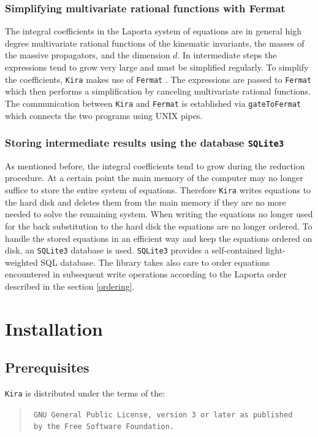 \documentclass[a4paper,12pt]{scrartcl}
\newcommand*{\kira}{\texttt{Kira}}
\newcommand*{\gatetofermat}{\texttt{gateToFermat}}
\newcommand*{\fermat}{\texttt{Fermat}}
\newcommand*{\sqlite}{\texttt{SQLite3}}
\begin{document}
\subsubsection{Simplifying multivariate rational functions with Fermat}
\label{Fermat}

The integral coefficients in the Laporta system of equations are in general high
degree multivariate rational functions of the kinematic invariants, the masses
of the massive propagators, and the dimension $d$. In intermediate steps the
expressions tend to grow very large and must be simplified regularly. To
simplify the coefficients, \kira{} makes use of \fermat{} \cite{Fermat}. The
expressions are passed to \fermat{} which then performs a simplification by canceling multivariate 
rational functions. The communication between \kira{} and \fermat{} is established 
via \gatetofermat{} \cite{FLINK} which connects the two programs using UNIX pipes.


\subsubsection{Storing intermediate results using the database \sqlite{}}
As mentioned before, the integral coefficients tend to grow during the reduction
procedure. At a certain point the main memory of the computer may no longer
suffice to store the entire system of equations. Therefore \kira{} writes
equations to the hard disk and deletes them from the main memory if they are no
more needed to solve the remaining system. When writing the equations no longer
used for the back substitution to the hard disk the equations are no longer
ordered. To handle the stored equations in an efficient way and keep the
equations ordered on disk, an \sqlite{}\cite{SQLite3} database is used. \sqlite{} provides a
self-contained light-weighted SQL database. The library takes also care to order
equations encountered in subsequent write operations according to the Laporta
order described in the section \ref{ordering}.


\section{Installation}
\subsection{Prerequisites}
\label{prerequisites}
\kira{} is distributed under the terms of the:
\begin{verse}
   \texttt{ GNU General Public License, version 3 or later as published}\\ 
   \texttt{ by the Free Software Foundation.}
\end{verse}
\end{document}
